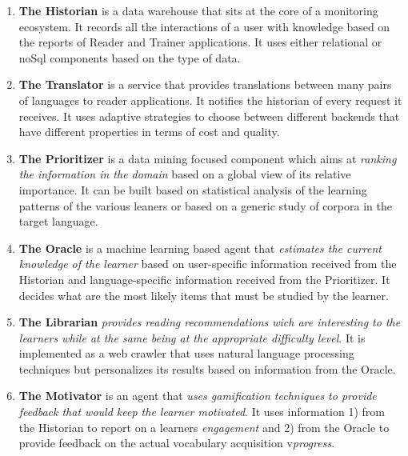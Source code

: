 \newcommand {\archiblock}[1]{\item {\bf #1}}
\begin{enumerate}
	
		\archiblock{The Historian} is a data warehouse that sits at the core of a monitoring ecosystem. It records all the interactions of a user with knowledge based on the reports of Reader and Trainer applications.
		It uses either relational or noSql components based on the type of data.

		\archiblock{The Translator} is a service that provides translations between many pairs of languages to reader applications. It notifies the historian of every request it receives. 
		It uses adaptive strategies to choose between different backends that have different properties in terms of cost and quality.

		\archiblock{The Prioritizer} is a data mining focused component which aims at {\em ranking the information in the domain} based on a global view of its relative importance. It can be built based on statistical analysis of the learning patterns of the various leaners or based on a generic study of corpora in the target language.

		\archiblock{The Oracle} is a machine learning based agent that {\em estimates the current knowledge of the learner} based on user-specific information received from the Historian and language-specific information received from the Prioritizer. It decides what are the most likely items that must be studied by the learner. 

		\archiblock {The Librarian} {\em provides reading recommendations wich are interesting to the learners while at the same being at the appropriate difficulty level}. It is implemented as a web crawler that uses natural language processing techniques but personalizes its results based on  information from the Oracle.

		\archiblock {The Motivator} is an agent that {\em uses gamification techniques to provide feedback that would keep the learner motivated}. It uses information 1) from the Historian to report on a learners {\em engagement} and 2) from the Oracle to provide feedback on the actual vocabulary acquisition v{\em progress}. 

\end{enumerate}





